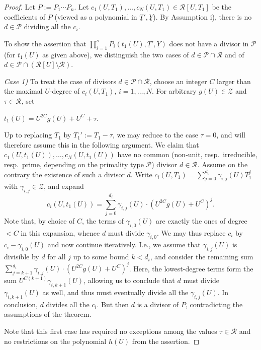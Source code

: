 \documentclass[11pt,a4paper,reqno]{amsart}
\theoremstyle{definition}
\begin{document}
\begin{proof}
Let $P:=P_1\cdots P_n$.  Let $c_1(U,T_1),\dots, c_N(U,T_1)\in \mathcal R[U,T_1]$ be the coefficients of $P$ (viewed as a polynomial in $\underline {T}', \underline Y$). By Assumption i), there is no $d\in \mathcal P$ 
dividing all the $c_i$. 

To show the assertion that $\prod_{i=1}^s P_i(t_1(U),\underline{T}',\underline{Y})$ does not have a divisor in $\mathcal{P}$ (for $t_1(U)$ as given above), we distinguish the two cases of $d\in \mathcal{P}\cap \mathcal R$ and of $d\in \mathcal{P}\cap(\mathcal R[U]\setminus \mathcal R)$.
\vskip 1mm


\noindent
\emph{Case 1)} To treat the case of divisors $d\in \mathcal{P}\cap \mathcal{R}$,  choose an integer $C$ larger than the maximal $U$-degree of $c_i(U,T_1)$, $i=1,\dots, N$. For arbitrary $g(U)\in \mathcal{Z}$ and $\tau\in \mathcal{R}$, set 
\vskip 1mm

\centerline{$t_1(U) = U^{2C} g(U) + U^C + \tau$.}
\vskip 1mm

\noindent
Up to replacing $T_1$ by $T_1':=T_1-\tau$, we may reduce to the case $\tau=0$, and will therefore assume this in the following argument. We claim that $c_1(U,t_1(U)),\dots, c_N(U,t_1(U))$ have no common (non-unit, resp.\ irreducible, resp.\ prime, depending on the primality type $\mathcal{P}$) divisor $d\in \mathcal{R}$. Assume on the contrary the existence of such a divisor $d$. Write $c_i(U,T_1) = \sum_{j=0}^{d_i}\gamma_{i,j}(U) T_1^j$ with $\gamma_{i,j}\in \mathcal{Z}$, and expand $$c_i(U,t_1(U)) = \sum_{j=0}^{d_i}\gamma_{i,j}(U)\cdot (U^{2C} g(U) + U^C)^j.$$ 
 Note that, by choice of $C$, the terms of $\gamma_{i,0}(U)$ are exactly the ones of degree $<C$ in this expansion, whence $d$ must divide $\gamma_{i,0}$. We may thus replace $c_i$ by $c_i-\gamma_{i,0}(U)$ and now continue iteratively. I.e., we assume that $\gamma_{i,j}(U)$ is divisible by $d$ for all $j$ up to some bound $k<d_i$, and consider the remaining sum $\sum_{j=k+1}^{d_i} \gamma_{i,j}(U)\cdot (U^{2C} g(U) + U^C)^j$. Here, the lowest-degree terms form the sum $U^{C(k+1)}\gamma_{i,k+1}(U)$, allowing us to conclude that $d$ must divide  $\gamma_{i,k+1}(U)$ as well, and thus must eventually divide all the $\gamma_{i,j}(U)$. In conclusion, $d$ divides all the $c_i$. But then $d$ is a divisor of $P$, contradicting the assumptions of the theorem.

Note that this first case has required no exceptions among the values $\tau\in \mathcal{R}$ and no restrictions on the polynomial $h(U)$ from the assertion.
\vskip 1mm



\end{proof}
\end{document}
